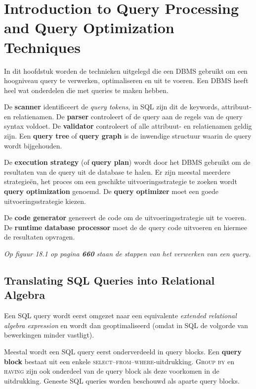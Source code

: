 \chapter{Introduction to Query Processing and Query Optimization Techniques}
In dit hoofdstuk worden de technieken uitgelegd die een DBMS gebruikt om een hoogniveau query te verwerken, optimaliseren en uit te voeren. Een DBMS heeft heel wat onderdelen die met queries te maken hebben.

De \textbf{scanner} identificeert de \textit{query tokens}, in SQL zijn dit de keywords, attribuut- en relatienamen. De \textbf{parser} controleert of de query aan de regels van de query syntax voldoet. De \textbf{validator} controleert of alle attribuut- en relatienamen geldig zijn. Een \textbf{query tree} of \textbf{query graph} is de inwendige structuur waarin de query wordt bijgehouden.

De \textbf{execution strategy} (of \textbf{query plan}) wordt door het DBMS gebruikt om de resultaten van de query uit de database te halen. Er zijn meestal meerdere strategie\"en, het proces om een geschikte uitvoeringsstrategie te zoeken wordt \textbf{query optimization} genoemd. De \textbf{query optimizer} moet een goede uitvoeringsstrategie kiezen.

De \textbf{code generator} genereert de code om de uitvoeringsstrategie uit te voeren. De \textbf{runtime database processor} moet de de query code uitvoeren en hiermee de resultaten opvragen.

\textit{Op figuur 18.1 op pagina \textbf{660} staan de stappen van het verwerken van een query.}



\section{Translating SQL Queries into Relational Algebra}
Een SQL query wordt eerst omgezet naar een equivalente \textit{extended relational algebra expression} en wordt dan geoptimaliseerd (omdat in SQL de volgorde van bewerkingen minder vastligt).

Meestal wordt een SQL query eerst onderverdeeld in query blocks. Een \textbf{query block} bestaat uit een enkele \textsc{select}--\textsc{from}--\textsc{where}-uitdrukking. \textsc{Group by} en \textsc{having} zijn ook onderdeel van de query block als deze voorkomen in de uitdrukking. Geneste SQL queries worden beschouwd als aparte query blocks. 



